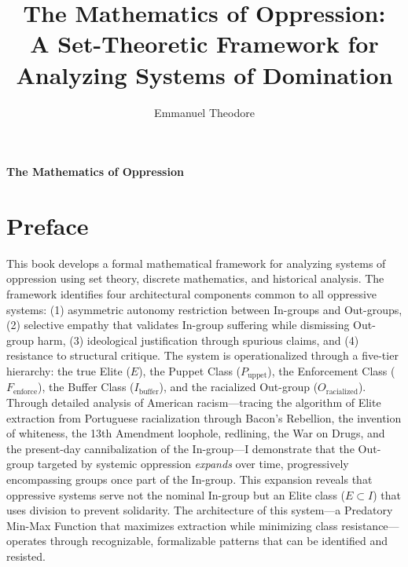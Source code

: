 \documentclass[12pt,openany]{book}
\title{The Mathematics of Oppression:\\A Set-Theoretic Framework for Analyzing Systems of Domination}
\author{Emmanuel Theodore}
\date{}
\begin{document}
\thispagestyle{empty}
\vspace*{\fill}
\begin{center}
{\Huge\bfseries The Mathematics of Oppression}
\end{center}
\vspace*{\fill}
\cleardoublepage

\maketitle

\frontmatter
\tableofcontents
\listoffigures

\chapter*{Preface}

This book develops a formal mathematical framework for analyzing systems of oppression using set theory, discrete mathematics, and historical analysis. The framework identifies four architectural components common to all oppressive systems: (1) asymmetric autonomy restriction between In-groups and Out-groups, (2) selective empathy that validates In-group suffering while dismissing Out-group harm, (3) ideological justification through spurious claims, and (4) resistance to structural critique. The system is operationalized through a five-tier hierarchy: the true Elite ($E$), the Puppet Class ($P_{\text{uppet}}$), the Enforcement Class ($F_{\text{enforce}}$), the Buffer Class ($I_{\text{buffer}}$), and the racialized Out-group ($O_{\text{racialized}}$). Through detailed analysis of American racism---tracing the algorithm of Elite extraction from Portuguese racialization through Bacon's Rebellion, the invention of whiteness, the 13th Amendment loophole, redlining, the War on Drugs, and the present-day cannibalization of the In-group---I demonstrate that the Out-group targeted by systemic oppression \textit{expands} over time, progressively encompassing groups once part of the In-group. This expansion reveals that oppressive systems serve not the nominal In-group but an Elite class ($E \subset I$) that uses division to prevent solidarity. The architecture of this system---a Predatory Min-Max Function that maximizes extraction while minimizing class resistance---operates through recognizable, formalizable patterns that can be identified and resisted.

\mainmatter
\end{document}
